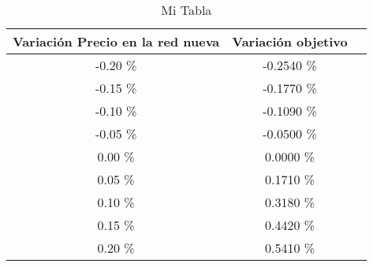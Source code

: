 \begin{table}
\centering
\begin{tabular}{|c|c|c|}
\hline
 Variación Precio en la red nueva & Variación objetivo \\ \hline
-0.20 \% & -0.2540 \% \\ \hline
-0.15 \% & -0.1770 \% \\ \hline
-0.10 \% & -0.1090 \% \\ \hline
-0.05 \% & -0.0500 \% \\ \hline
0.00 \% & 0.0000 \% \\ \hline
0.05 \% & 0.1710 \% \\ \hline
0.10 \% & 0.3180 \% \\ \hline
0.15 \% & 0.4420 \% \\ \hline
0.20 \% & 0.5410 \% \\ \hline
\end{tabular}
\caption{Mi Tabla}
\end{table}
